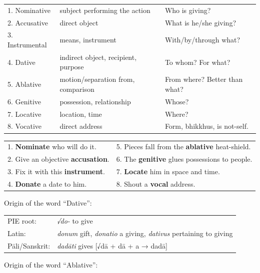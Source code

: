\documentclass[a4paper]{memoir}
\begin{document}
\begin{tabular}{lll}
1. Nominative & subject performing the action & Who is giving?\\[0pt]
2. Accusative & direct object & What is he/she giving?\\[0pt]
3. Instrumental & means, instrument & With/by/through what?\\[0pt]
4. Dative & indirect object, recipient, purpose & To whom? For what?\\[0pt]
5. Ablative & motion/separation from, comparison & From where? Better than what?\\[0pt]
6. Genitive & possession, relationship & Whose?\\[0pt]
7. Locative & location, time & Where?\\[0pt]
8. Vocative & direct address & Form, bhikkhus, is not-self.\\[0pt]
\end{tabular}


\begin{center}
\begin{tabular}{ll}
1. \textbf{Nominate} who will do it. & 5. Pieces fall from the \textbf{ablative} heat-shield.\\[0pt]
2. Give an objective \textbf{accusation}. & 6. The \textbf{genitive} glues possessions to people.\\[0pt]
3. Fix it with this \textbf{instrument}. & 7. \textbf{Locate} him in space and time.\\[0pt]
4. \textbf{Donate} a date to him. & 8. Shout a \textbf{vocal} address.\\[0pt]
\end{tabular}
\end{center}

Origin of the word ``Dative'':

\begin{center}
\begin{tabular}{ll}
PIE root: & \emph{√do-} to give\\[0pt]
Latin: & \emph{donum} gift, \emph{donatio} a giving, \emph{dativus} pertaining to giving\\[0pt]
Pāli/Sanskrit: & \emph{dadāti} gives [√dā + dā + a → dadā]\\[0pt]
\end{tabular}
\end{center}

Origin of the word ``Ablative'':
\end{document}
